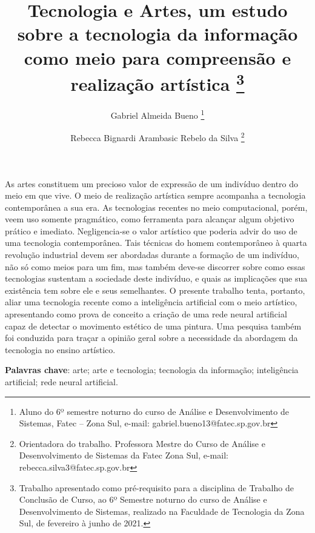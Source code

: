 \documentclass[12pt, a4paper]{article}
\title{\textbf{Tecnologia e Artes}, um estudo sobre a tecnologia da informação como meio para compreensão e realização artística \protect\footnote{Trabalho apresentado como pré-requisito para a disciplina de Trabalho de Conclusão de Curso, ao 6º Semestre noturno do curso de Análise e Desenvolvimento de Sistemas, realizado na Faculdade de Tecnologia da Zona Sul, de fevereiro à junho de 2021.}}
\author{
Gabriel Almeida Bueno
\thanks{Aluno do 6º semestre noturno do curso de Análise e Desenvolvimento de Sistemas, Fatec – Zona Sul, e-mail: gabriel.bueno13@fatec.sp.gov.br}
%
\and
%
Rebecca Bignardi Arambasic Rebelo da Silva
\thanks{Orientadora do trabalho. Professora Mestre do Curso de Análise e Desenvolvimento de Sistemas da Fatec Zona Sul, e-mail: rebecca.silva3@fatec.sp.gov.br}
}
\affil{Faculdade de Tecnologia da Zona Sul, São Paulo, SP}
\date{}
\renewenvironment{abstract}
  {\small\quotation
  {\bfseries\noindent{\small\abstractname}\par\nobreak\smallskip}}
  {\endquotation}
\begin{document}
\maketitle



\newpage
\begin{abstract}
\noindent
As artes constituem um precioso valor de expressão de um indivíduo dentro do meio em que vive. O meio de realização artística sempre acompanha a tecnologia contemporânea a sua era. As tecnologias recentes no meio computacional, porém, veem uso somente pragmático, como ferramenta para alcançar algum objetivo prático e imediato. Negligencia-se o valor artístico que poderia advir do uso de uma tecnologia contemporânea. Tais técnicas do homem contemporâneo à quarta revolução industrial devem ser abordadas durante a formação de um indivíduo, não só como meios para um fim, mas também deve-se discorrer sobre como essas tecnologias sustentam a sociedade deste indivíduo, e quais as implicações que sua existência tem sobre ele e seus semelhantes. O presente trabalho tenta, portanto, aliar uma tecnologia recente como a inteligência artificial com o meio artístico, apresentando como prova de conceito a criação de uma rede neural artificial capaz de detectar o movimento estético de uma pintura. Uma pesquisa também foi conduzida para traçar a opinião geral sobre a necessidade da abordagem da tecnologia no ensino artístico.

\noindent
\textbf{Palavras chave}: arte; arte e tecnologia; tecnologia da informação; inteligência artificial; rede neural artificial.
\end{abstract}
\end{document}

